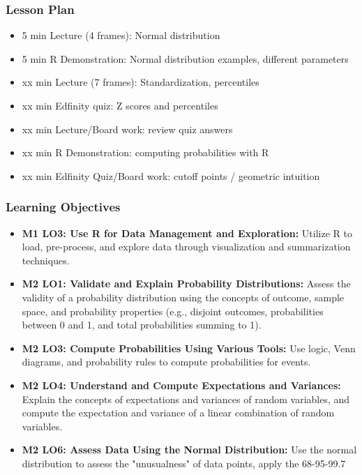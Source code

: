 \begin{frame}
    \frametitle{Lesson Plan}
    \begin{itemize}
        \item 5 min Lecture (4 frames): Normal distribution
        \item 5 min R Demonstration: Normal distribution examples, different parameters
        \item xx min Lecture (7 frames): Standardization, percentiles
        \item xx min Edfinity quiz: Z scores and percentiles
        \item xx min Lecture/Board work: review quiz answers
        \item xx min R Demonstration: computing probabilities with R
        \item xx min Edfinity Quiz/Board work: cutoff points / geometric intuition
    \end{itemize}
\end{frame}

\begin{frame}
    \frametitle{Learning Objectives}
    \begin{itemize}
        \item \textbf{M1 LO3: Use R for Data Management and Exploration:} Utilize R to load, pre-process, and explore data through visualization and summarization techniques.
        \item \textbf{M2 LO1: Validate and Explain Probability Distributions:} Assess the validity of a probability distribution using the concepts of outcome, sample space, and probability properties (e.g., disjoint outcomes, probabilities between 0 and 1, and total probabilities summing to 1).
        \item \textbf{M2 LO3: Compute Probabilities Using Various Tools:} Use logic, Venn diagrams, and probability rules to compute probabilities for events.
        \item \textbf{M2 LO4: Understand and Compute Expectations and Variances:} Explain the concepts of expectations and variances of random variables, and compute the expectation and variance of a linear combination of random variables.
        \item \textbf{M2 LO6: Assess Data Using the Normal Distribution:} Use the normal distribution to assess the "unusualness" of data points, apply the 68-95-99.7%
    \end{itemize}
\end{frame}


